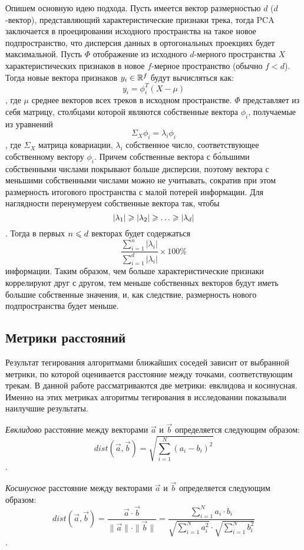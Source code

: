 Опишем основную идею подхода. Пусть имеется вектор размерностью $d$ ($d$-вектор), представляющий характеристические признаки трека, тогда PCA заключается в проецировании исходного пространства
на такое новое подпространство, что дисперсия данных в ортогональных проекциях будет максимальной. Пусть $\Phi$ \ld отображение из исходного $d$-мерного пространства $X$ характеристических
признаков в новое $f$-мерное пространство (обычно $f < d$). Тогда новые вектора признаков $y_i \in \mathbb{R}^f$ будут вычисляться как:
$$ y_i = \phi_i^T(X - \mu) $$,
где $\mu$ \ld среднее векторов всех треков в исходном пространстве. $\Phi$ представляет из себя матрицу, столбцами которой являются собственные вектора $\phi_i$, получаемые из уравнений
$$\Sigma_X \phi_i = \lambda_i\phi_i $$,
где $\Sigma_X$ \ld матрица ковариации, $\lambda_i$ \ld собственное число, соответствующее собственному вектору $\phi_i$. Причем собственные вектора с б\'{о}льшими собственными числами покрывают
больше дисперсии, поэтому вектора с меньшими собственными числами можно не учитывать, сократив при этом размерность итогового пространства с малой потерей информации. Для наглядности 
перенумеруем собственные вектора так, чтобы
$$|\lambda_1| \geqslant |\lambda_2| \geqslant \ldots \geqslant |\lambda_d|$$.
Тогда в первых $n \leqslant d$ векторах будет содержаться 
$$\frac{\sum_{i=1}^{n} |\lambda_i|}{\sum_{i=1}^{d} |\lambda_i|} \times 100\%$$ 
информации. Таким образом, чем больше характеристические признаки коррелируют друг с другом, тем меньше собственных векторов будут иметь большие собственные значения, и, как следствие, размерность нового подпространства
будет меньше.

\subsection{Метрики расстояний}

Результат тегирования алгоритмами ближайших соседей зависит от выбранной метрики, по которой оценивается расстояние между точками, соответствующим трекам.
В данной работе рассматриваются две метрики: евклидова и косинусная. Именно на этих метриках алгоритмы тегирования в исследовании \cite{msordo_thesis} показывали наилучшие результаты.

\emph{Евклидово} расстояние между векторами $\vec{a}$ и $\vec{b}$ определяется следующим образом:
$$ dist(\vec{a}, \vec{b}) = \sqrt{\sum_{i=1}^{N} (a_i - b_i)^2} $$.

\emph{Косинусное} расстояние между векторами $\vec{a}$ и $\vec{b}$ определяется следующим образом:
$$ dist(\vec{a}, \vec{b}) = \frac{\vec{a} \cdot \vec{b}}{\| \vec{a} \| \cdot \| \vec{b} \|} = \frac{\sum_{i=1}^{N} a_i \cdot b_i}{\sqrt{\sum_{i=1}^{N} a_i^2} \cdot \sqrt{\sum_{i=1}^{N} b_i^2}} $$.


